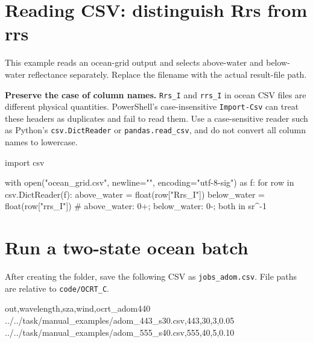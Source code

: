 \section{Reading CSV: distinguish Rrs from rrs}
\label{sec:auto:04_examples:15}

\label{sec:example_csv_reader}

This example reads an ocean-grid output and selects above-water and below-water reflectance separately. Replace the filename with the actual result-file path.

\textbf{Preserve the case of column names.} \texttt{Rrs\_\allowbreak{}I} and \texttt{rrs\_\allowbreak{}I} in ocean CSV files are different physical quantities. PowerShell's case-insensitive \texttt{Import-\allowbreak{}Csv} can treat these headers as duplicates and fail to read them. Use a case-sensitive reader such as Python's \texttt{csv.\allowbreak{}DictReader} or \texttt{pandas.\allowbreak{}read\_\allowbreak{}csv}, and do not convert all column names to lowercase.

\par\noindent\begin{minipage}{\linewidth}
\begin{ManualCode}
import csv

with open("ocean_grid.csv", newline="", encoding="utf-8-sig") as f:
    for row in csv.DictReader(f):
        above_water = float(row["Rrs_I"])
        below_water = float(row["rrs_I"])
        # above_water: 0+; below_water: 0-; both in sr^-1
\end{ManualCode}
\end{minipage}\par

\section{Run a two-state ocean batch}
\label{sec:auto:04_examples:16}

\label{sec:example_input_batch}

After creating the folder, save the following CSV as \texttt{jobs\_\allowbreak{}adom.\allowbreak{}csv}. File paths are relative to \texttt{code/\allowbreak{}OCRT\_\allowbreak{}C}.


\par\noindent\begin{minipage}{\linewidth}
\begin{ManualCode}
out,wavelength,sza,wind,ocrt_adom440
../../task/manual_examples/adom_443_s30.csv,443,30,3,0.05
../../task/manual_examples/adom_555_s40.csv,555,40,5,0.10
\end{ManualCode}
\end{minipage}\par


